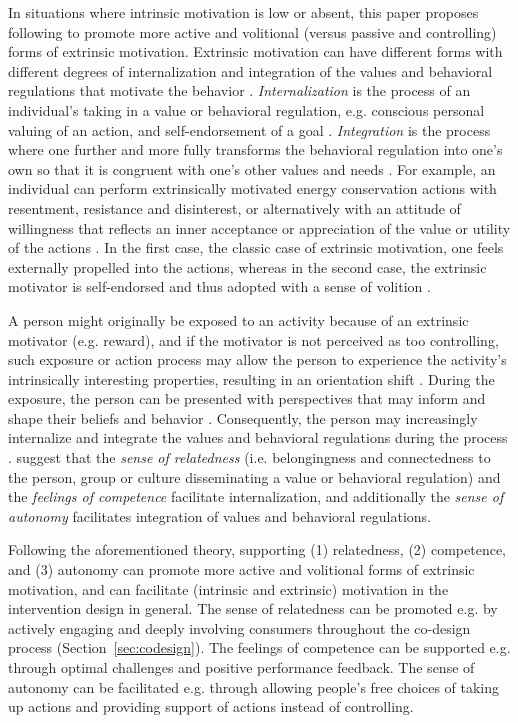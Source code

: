 \documentclass[a4paper,10pt]{article}
\begin{document}
In situations where intrinsic motivation is low or absent, this paper proposes following \citet{Ryan2000} to promote more active and volitional (versus passive and controlling) forms of extrinsic motivation. Extrinsic motivation can have different forms with different degrees of internalization and integration of the values and behavioral regulations that motivate the behavior \citep{Ryan2000}. \textit{Internalization} is the process of an individual's taking in a value or behavioral regulation, e.g. conscious personal valuing of an action, and self-endorsement of a goal \citep{Ryan2000}. \textit{Integration} is the process where one further and more fully transforms the behavioral regulation into one's own so that it is congruent with one's other values and needs \citep{Ryan2000}. For example, an individual can perform extrinsically motivated energy conservation actions with resentment, resistance and disinterest, or alternatively with an attitude of willingness that reflects an inner acceptance or appreciation of the value or utility of the actions \citep{Ryan2000}. In the first case, the classic case of extrinsic motivation, one feels externally propelled into the actions, whereas in the second case, the extrinsic motivator is self-endorsed and thus adopted with a sense of volition \citep{Ryan2000}. 

A person might originally be exposed to an activity because of an extrinsic motivator (e.g. reward), and if the motivator is not perceived as too controlling, such exposure or action process may allow the person to experience the activity's intrinsically interesting properties, resulting in an orientation shift \citep{Ryan2000}. During the exposure, the person can be presented with perspectives that may inform and shape their beliefs and behavior \citep{Brynjarsdottir2012}. Consequently, the person may increasingly internalize and integrate the values and behavioral regulations during the process \citep{Ryan2000}. \citet{Ryan2000} suggest that the \textit{sense of relatedness} (i.e. belongingness and connectedness to the person, group or culture disseminating a value or behavioral regulation) and the \textit{feelings of competence} facilitate internalization, and additionally the \textit{sense of autonomy} facilitates integration of values and behavioral regulations. 

Following the aforementioned theory, supporting (1) relatedness, (2) competence, and (3) autonomy can promote more active and volitional forms of extrinsic motivation, and can facilitate (intrinsic and extrinsic) motivation in the intervention design in general. The sense of relatedness can be promoted e.g. by actively engaging and deeply involving consumers throughout the co-design process (Section~\ref{sec:codesign}). The feelings of competence can be supported e.g. through optimal challenges \citep{Guadagnoli2004} and positive performance feedback. The 
sense of autonomy can be facilitated e.g. through allowing people's free choices of taking up actions and providing support of actions instead of controlling. 
\end{document}
